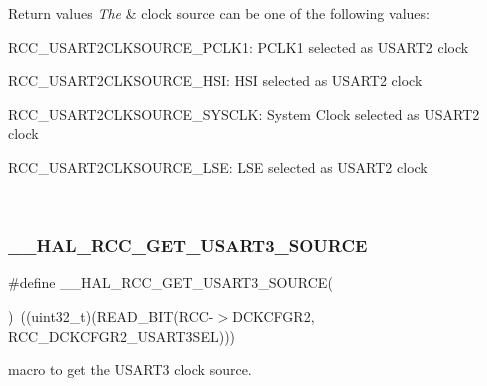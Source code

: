 \begin{DoxyRetVals}{Return values}
{\em The} & clock source can be one of the following values\+: \begin{DoxyItemize}
\item R\+C\+C\+\_\+\+U\+S\+A\+R\+T2\+C\+L\+K\+S\+O\+U\+R\+C\+E\+\_\+\+P\+C\+L\+K1\+: P\+C\+L\+K1 selected as U\+S\+A\+R\+T2 clock \item R\+C\+C\+\_\+\+U\+S\+A\+R\+T2\+C\+L\+K\+S\+O\+U\+R\+C\+E\+\_\+\+H\+SI\+: H\+SI selected as U\+S\+A\+R\+T2 clock \item R\+C\+C\+\_\+\+U\+S\+A\+R\+T2\+C\+L\+K\+S\+O\+U\+R\+C\+E\+\_\+\+S\+Y\+S\+C\+LK\+: System Clock selected as U\+S\+A\+R\+T2 clock \item R\+C\+C\+\_\+\+U\+S\+A\+R\+T2\+C\+L\+K\+S\+O\+U\+R\+C\+E\+\_\+\+L\+SE\+: L\+SE selected as U\+S\+A\+R\+T2 clock \end{DoxyItemize}
\\
\hline
\end{DoxyRetVals}
\mbox{\label{group___r_c_c_ex___exported___macros_gab52c0cea73126e6f71f7ea7cb9d37378}} 
\subsubsection{\texorpdfstring{\_\_HAL\_RCC\_GET\_USART3\_SOURCE}{\_\_HAL\_RCC\_GET\_USART3\_SOURCE}}
{\footnotesize\ttfamily \#define \+\_\+\+\_\+\+H\+A\+L\+\_\+\+R\+C\+C\+\_\+\+G\+E\+T\+\_\+\+U\+S\+A\+R\+T3\+\_\+\+S\+O\+U\+R\+CE(\begin{DoxyParamCaption}{ }\end{DoxyParamCaption})~((uint32\+\_\+t)(R\+E\+A\+D\+\_\+\+B\+IT(R\+CC-\/$>$D\+C\+K\+C\+F\+G\+R2, R\+C\+C\+\_\+\+D\+C\+K\+C\+F\+G\+R2\+\_\+\+U\+S\+A\+R\+T3\+S\+EL)))}



macro to get the U\+S\+A\+R\+T3 clock source. 


